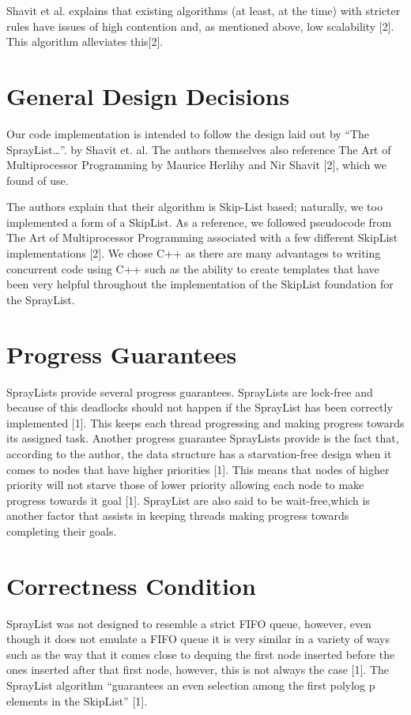 \documentclass[conference]{IEEEtran}
\begin{document}
Shavit et al. explains that existing algorithms (at least, at the time) with stricter rules have issues of high contention and, as mentioned above, low scalability [2]. This algorithm alleviates this[2].

\section{General Design Decisions}
Our code implementation is intended to follow the design laid out by  “The SprayList…”. by Shavit et. al. The authors themselves also reference The Art of Multiprocessor Programming by Maurice Herlihy and Nir Shavit [2], which we found of use. 

The authors explain that their algorithm is Skip-List based;  naturally, we too implemented a form of a SkipList.  As a reference, we followed pseudocode from The Art of Multiprocessor Programming associated with a few different SkipList implementations [2].  We chose C++ as there are many advantages to writing concurrent code using C++ such as the ability to create templates that have been very helpful throughout the implementation of the SkipList foundation for the SprayList.


\section{Progress Guarantees}
SprayLists provide several progress guarantees. SprayLists are lock-free and because of this deadlocks should not happen if the SprayList has been correctly implemented [1]. This keeps each thread progressing and making progress towards its assigned task.  Another progress guarantee SprayLists provide is the fact that, according to the author, the data structure has a starvation-free design when it comes to nodes that have higher priorities [1]. This means that nodes of higher priority will not starve those of lower priority allowing each node to make progress towards it goal [1]. SprayList are also said to be wait-free,which is another factor that assists in keeping threads making progress towards completing their goals. 

\section {Correctness Condition}

SprayList was not designed to resemble a strict FIFO queue, however, even though it does not emulate a FIFO queue it is very similar in a variety of ways such as the way that it comes close to dequing the first node inserted before the ones inserted after that first node, however, this is not always the case [1]. The SprayList algorithm “guarantees an even selection among the first polylog p elements in the SkipList” [1].
\end{document}
